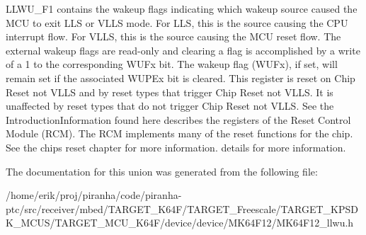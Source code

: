 L\+L\+W\+U\+\_\+\+F1 contains the wakeup flags indicating which wakeup source caused the M\+CU to exit L\+LS or V\+L\+LS mode. For L\+LS, this is the source causing the C\+PU interrupt flow. For V\+L\+LS, this is the source causing the M\+CU reset flow. The external wakeup flags are read-\/only and clearing a flag is accomplished by a write of a 1 to the corresponding W\+U\+Fx bit. The wakeup flag (W\+U\+Fx), if set, will remain set if the associated W\+U\+P\+Ex bit is cleared. This register is reset on Chip Reset not V\+L\+LS and by reset types that trigger Chip Reset not V\+L\+LS. It is unaffected by reset types that do not trigger Chip Reset not V\+L\+LS. See the Introduction\+Information found here describes the registers of the Reset Control Module (R\+CM). The R\+CM implements many of the reset functions for the chip. See the chip\textquotesingle{}s reset chapter for more information. details for more information. 

The documentation for this union was generated from the following file\+:\begin{DoxyCompactItemize}
\item 
/home/erik/proj/piranha/code/piranha-\/ptc/src/receiver/mbed/\+T\+A\+R\+G\+E\+T\+\_\+\+K64\+F/\+T\+A\+R\+G\+E\+T\+\_\+\+Freescale/\+T\+A\+R\+G\+E\+T\+\_\+\+K\+P\+S\+D\+K\+\_\+\+M\+C\+U\+S/\+T\+A\+R\+G\+E\+T\+\_\+\+M\+C\+U\+\_\+\+K64\+F/device/device/\+M\+K64\+F12/M\+K64\+F12\+\_\+llwu.\+h\end{DoxyCompactItemize}
